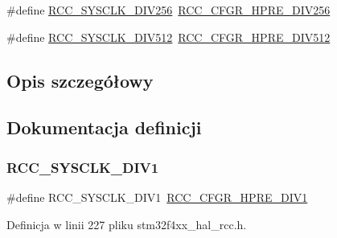 \begin{DoxyCompactItemize}
\item 
\#define \hyperlink{group___r_c_c___a_h_b___clock___source_ga94956d6e9c3a78230bf660b838f987e2}{R\+C\+C\+\_\+\+S\+Y\+S\+C\+L\+K\+\_\+\+D\+I\+V256}~\hyperlink{group___peripheral___registers___bits___definition_ga089930cedd5b2cb201e717438f29d25b}{R\+C\+C\+\_\+\+C\+F\+G\+R\+\_\+\+H\+P\+R\+E\+\_\+\+D\+I\+V256}
\item 
\#define \hyperlink{group___r_c_c___a_h_b___clock___source_gabe18a9d55c0858bbfe3db657fb64c76d}{R\+C\+C\+\_\+\+S\+Y\+S\+C\+L\+K\+\_\+\+D\+I\+V512}~\hyperlink{group___peripheral___registers___bits___definition_gae5088dcbaefc55d4b6693e9b1e595ed0}{R\+C\+C\+\_\+\+C\+F\+G\+R\+\_\+\+H\+P\+R\+E\+\_\+\+D\+I\+V512}
\end{DoxyCompactItemize}


\subsection{Opis szczegółowy}


\subsection{Dokumentacja definicji}
\mbox{\label{group___r_c_c___a_h_b___clock___source_ga226f5bf675015ea677868132b6b83494}} 
\subsubsection{\texorpdfstring{R\+C\+C\+\_\+\+S\+Y\+S\+C\+L\+K\+\_\+\+D\+I\+V1}{RCC\_SYSCLK\_DIV1}}
{\footnotesize\ttfamily \#define R\+C\+C\+\_\+\+S\+Y\+S\+C\+L\+K\+\_\+\+D\+I\+V1~\hyperlink{group___peripheral___registers___bits___definition_ga2b7d7f29b09a49c31404fc0d44645c84}{R\+C\+C\+\_\+\+C\+F\+G\+R\+\_\+\+H\+P\+R\+E\+\_\+\+D\+I\+V1}}



Definicja w linii 227 pliku stm32f4xx\+\_\+hal\+\_\+rcc.\+h.

\mbox{\label{group___r_c_c___a_h_b___clock___source_ga43eddf4d4160df30548a714dce102ad8}} 
